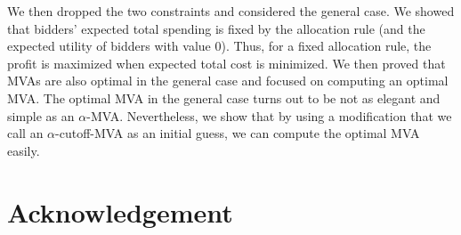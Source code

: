 \documentclass{aamas2013}
\begin{document}
We then dropped the two constraints and considered the general case.  We showed
that bidders' expected total spending is fixed by the allocation rule (and the
expected utility of bidders with value $0$). Thus, for a fixed allocation rule,
the profit is maximized when expected total cost is minimized.  We then proved
that MVAs are also optimal in the general case and focused on computing an
optimal MVA.  The optimal MVA in the general case turns out to be not as
elegant and simple as an $\alpha$-MVA.  Nevertheless, we show that by using a
modification that we call an $\alpha$-cutoff-MVA as an initial guess, we can
compute the optimal MVA easily.

\section{Acknowledgement}



\end{document}
